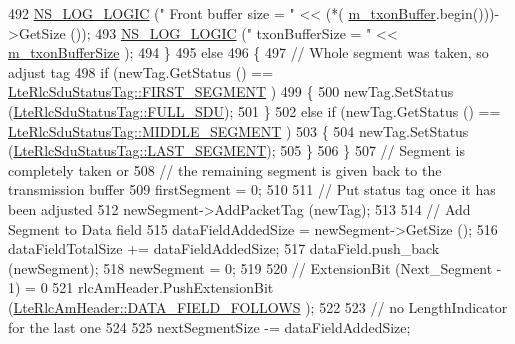 \begin{DoxyCode}
492               \hyperlink{group__logging_ga88acd260151caf2db9c0fc84997f45ce}{NS\_LOG\_LOGIC} (\textcolor{stringliteral}{"    Front buffer size = "} << (*(
      \hyperlink{classns3_1_1LteRlcAm_ad8ba4549a7c78cfe0e528d2e9cc465f8}{m\_txonBuffer}.begin()))->GetSize ());
493               \hyperlink{group__logging_ga88acd260151caf2db9c0fc84997f45ce}{NS\_LOG\_LOGIC} (\textcolor{stringliteral}{"    txonBufferSize = "} << 
      \hyperlink{classns3_1_1LteRlcAm_a3e8db6b5bc1d3fcc215d554e8d347eda}{m\_txonBufferSize} );
494             \}
495           \textcolor{keywordflow}{else}
496             \{
497               \textcolor{comment}{// Whole segment was taken, so adjust tag}
498               \textcolor{keywordflow}{if} (newTag.GetStatus () == \hyperlink{classns3_1_1LteRlcSduStatusTag_ae7822c5cc0d54a3d193b09a91ed6f133afda65e6233ba6fd1cd8aacf54cd11269}{LteRlcSduStatusTag::FIRST\_SEGMENT}
      )
499                 \{
500                   newTag.SetStatus (\hyperlink{classns3_1_1LteRlcSduStatusTag_ae7822c5cc0d54a3d193b09a91ed6f133ade41b0025c66cd211e992196f314d4a5}{LteRlcSduStatusTag::FULL\_SDU});
501                 \}
502               \textcolor{keywordflow}{else} \textcolor{keywordflow}{if} (newTag.GetStatus () == \hyperlink{classns3_1_1LteRlcSduStatusTag_ae7822c5cc0d54a3d193b09a91ed6f133a37a54694d337625c0c8541e3008d1d64}{LteRlcSduStatusTag::MIDDLE\_SEGMENT}
      )
503                 \{
504                   newTag.SetStatus (\hyperlink{classns3_1_1LteRlcSduStatusTag_ae7822c5cc0d54a3d193b09a91ed6f133a4e59540a0a5c4530b61e4feda355be7b}{LteRlcSduStatusTag::LAST\_SEGMENT});
505                 \}
506             \}
507           \textcolor{comment}{// Segment is completely taken or}
508           \textcolor{comment}{// the remaining segment is given back to the transmission buffer}
509           firstSegment = 0;
510 
511           \textcolor{comment}{// Put status tag once it has been adjusted}
512           newSegment->AddPacketTag (newTag);
513 
514           \textcolor{comment}{// Add Segment to Data field}
515           dataFieldAddedSize = newSegment->GetSize ();
516           dataFieldTotalSize += dataFieldAddedSize;
517           dataField.push\_back (newSegment);
518           newSegment = 0;
519 
520           \textcolor{comment}{// ExtensionBit (Next\_Segment - 1) = 0}
521           rlcAmHeader.PushExtensionBit (\hyperlink{classns3_1_1LteRlcAmHeader_a516bc34a521085f22b455aeac9ebc364ad70b61eeac2e18a01f13b8f94530ba1f}{LteRlcAmHeader::DATA\_FIELD\_FOLLOWS}
      );
522 
523           \textcolor{comment}{// no LengthIndicator for the last one}
524 
525           nextSegmentSize -= dataFieldAddedSize;

\end{DoxyCode}
